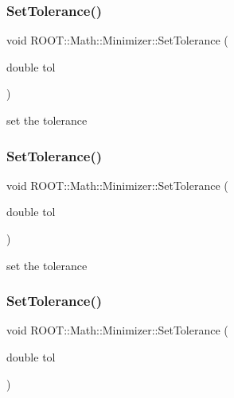 \subsubsection{\texorpdfstring{SetTolerance()}{SetTolerance()}\hspace{0.1cm}{\footnotesize\ttfamily [1/3]}}
{\footnotesize\ttfamily void R\+O\+O\+T\+::\+Math\+::\+Minimizer\+::\+Set\+Tolerance (\begin{DoxyParamCaption}\item[{double}]{tol }\end{DoxyParamCaption})\hspace{0.3cm}{\ttfamily [inline]}}



set the tolerance 

\mbox{\label{classROOT_1_1Math_1_1Minimizer_a5b7ee47a24b2412801654b8cde2c9b4f}} 
\subsubsection{\texorpdfstring{SetTolerance()}{SetTolerance()}\hspace{0.1cm}{\footnotesize\ttfamily [2/3]}}
{\footnotesize\ttfamily void R\+O\+O\+T\+::\+Math\+::\+Minimizer\+::\+Set\+Tolerance (\begin{DoxyParamCaption}\item[{double}]{tol }\end{DoxyParamCaption})\hspace{0.3cm}{\ttfamily [inline]}}



set the tolerance 

\mbox{\label{classROOT_1_1Math_1_1Minimizer_a5b7ee47a24b2412801654b8cde2c9b4f}} 
\subsubsection{\texorpdfstring{SetTolerance()}{SetTolerance()}\hspace{0.1cm}{\footnotesize\ttfamily [3/3]}}
{\footnotesize\ttfamily void R\+O\+O\+T\+::\+Math\+::\+Minimizer\+::\+Set\+Tolerance (\begin{DoxyParamCaption}\item[{double}]{tol }\end{DoxyParamCaption})\hspace{0.3cm}{\ttfamily [inline]}}



